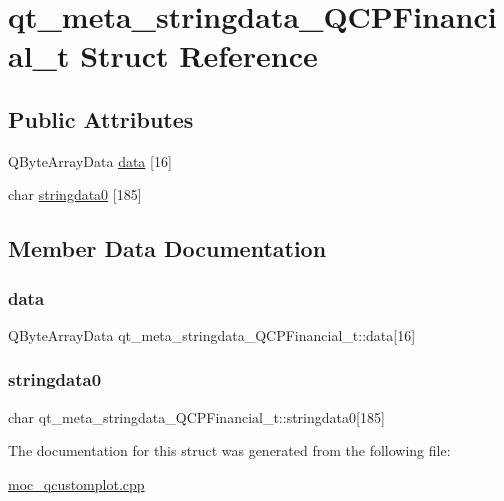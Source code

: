 \hypertarget{structqt__meta__stringdata__QCPFinancial__t}{}\section{qt\+\_\+meta\+\_\+stringdata\+\_\+\+Q\+C\+P\+Financial\+\_\+t Struct Reference}
\label{structqt__meta__stringdata__QCPFinancial__t}
\subsection*{Public Attributes}
\begin{DoxyCompactItemize}
\item 
Q\+Byte\+Array\+Data \mbox{\hyperlink{structqt__meta__stringdata__QCPFinancial__t_a32be9c8341c33d8c6da741702c103986}{data}} \mbox{[}16\mbox{]}
\item 
char \mbox{\hyperlink{structqt__meta__stringdata__QCPFinancial__t_ad8ba9429514fbfd381c387ad7d4fd8c5}{stringdata0}} \mbox{[}185\mbox{]}
\end{DoxyCompactItemize}


\subsection{Member Data Documentation}
\mbox{\label{structqt__meta__stringdata__QCPFinancial__t_a32be9c8341c33d8c6da741702c103986}} 
\subsubsection{\texorpdfstring{data}{data}}
{\footnotesize\ttfamily Q\+Byte\+Array\+Data qt\+\_\+meta\+\_\+stringdata\+\_\+\+Q\+C\+P\+Financial\+\_\+t\+::data\mbox{[}16\mbox{]}}

\mbox{\label{structqt__meta__stringdata__QCPFinancial__t_ad8ba9429514fbfd381c387ad7d4fd8c5}} 
\subsubsection{\texorpdfstring{stringdata0}{stringdata0}}
{\footnotesize\ttfamily char qt\+\_\+meta\+\_\+stringdata\+\_\+\+Q\+C\+P\+Financial\+\_\+t\+::stringdata0\mbox{[}185\mbox{]}}



The documentation for this struct was generated from the following file\+:\begin{DoxyCompactItemize}
\item 
\mbox{\hyperlink{moc__qcustomplot_8cpp}{moc\+\_\+qcustomplot.\+cpp}}\end{DoxyCompactItemize}
